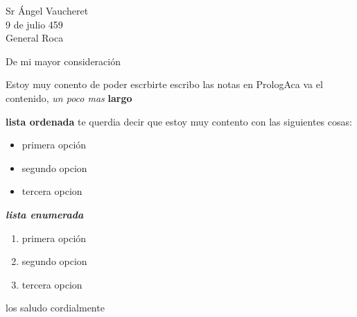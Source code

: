 \documentclass[12pt]{letter}
\begin{document}
\begin{letter}{%
Sr Ángel Vaucheret \\ 9 de julio 459 \\ General Roca }
\opening{%
De mi mayor consideración}
Estoy muy conento de poder escrbirte escribo las notas en PrologAca va el contenido, \textit{un poco mas }
\textbf{largo
}

\textbf{lista ordenada
}
te querdia decir que estoy muy contento con las siguientes cosas:\begin{itemize}
\item primera opción\item segundo opcion\item tercera opcion\end{itemize}
\textbf{\textit{lista enumerada}
}

\begin{enumerate}
\item primera opción\item segundo opcion\item tercera opcion\end{enumerate}
\closing{%
los saludo cordialmente}
\end{letter}
\end{document}
